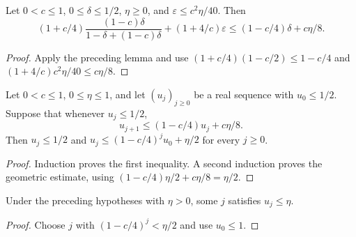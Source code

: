 \begin{lemma}
    \label{lem:filter_trim_error_le}
    \leanok
    Let $0<c\le1$, $0\le\delta\le1/2$, $\eta\ge0$, and
    $\varepsilon\le c^2\eta/40$. Then
    \[
        (1+c/4)\frac{(1-c)\delta}{1-\delta+(1-c)\delta}
        +(1+4/c)\varepsilon
        \le(1-c/4)\delta+c\eta/8.
    \]
\end{lemma}
\begin{proof}\leanok
    Apply the preceding lemma and use
    $(1+c/4)(1-c/2)\le1-c/4$ and
    $(1+4/c)c^2\eta/40\le c\eta/8$.
\end{proof}

\begin{lemma}
    \label{lem:filter_trim_iterate_le}
    \leanok
    Let $0<c\le1$, $0\le\eta\le1$, and let $(u_j)_{j\ge0}$ be a real
    sequence with $u_0\le1/2$. Suppose that whenever $u_j\le1/2$,
    \[
        u_{j+1}\le(1-c/4)u_j+c\eta/8.
    \]
    Then $u_j\le1/2$ and
    $u_j\le(1-c/4)^j u_0+\eta/2$ for every $j\ge0$.
\end{lemma}
\begin{proof}\leanok
    Induction proves the first inequality. A second induction proves
    the geometric estimate, using
    $(1-c/4)\eta/2+c\eta/8=\eta/2$.
\end{proof}

\begin{lemma}
    \label{lem:exists_filter_trim_iteration}
    \leanok
    Under the preceding hypotheses with $\eta>0$, some $j$ satisfies
    $u_j\le\eta$.
\end{lemma}
\begin{proof}\leanok
    Choose $j$ with $(1-c/4)^j<\eta/2$ and use $u_0\le1$.
\end{proof}

